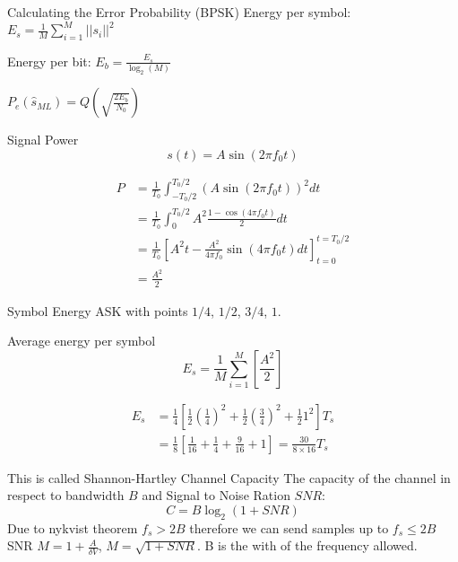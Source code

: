\begin{definitionblock}{Calculating the Error Probability (BPSK)}
    Energy per symbol: $E_s = \frac{1}{M}\sum_{i=1}^{M} ||s_i||^2$

    Energy per bit: $E_b = \frac{E_s}{\log_2(M)}$

    $P_e(\hat{s}_{ML}) = Q\left( \sqrt{\frac{2E_b}{N_0}} \right)$
\end{definitionblock}


\begin{exampleblock}{Signal Power}
    \begin{equation*}
        s(t) = A\sin(2\pi f_0 t)
    \end{equation*}

    \begin{align*}
        P &= \frac{1}{T_0} \int_{-T_0/2}^{T_0/2} (A\sin(2\pi f_0t))^2 dt \\
          &= \frac{1}{T_0} \int_{0}^{T_0/2} A^2\frac{1-\cos(4\pi f_0t)}{2} dt \\
          &= \frac{1}{T_0} \left[ A^2t - \frac{A^2}{4\pi f_0}\sin(4\pi f_0 t) dt \right]_{t=0}^{t={T_0/2}} \\
          &= \frac{A^2}{2}
    \end{align*}
\end{exampleblock}


\begin{exampleblock}{Symbol Energy}
    ASK with points $1/4$, $1/2$, $3/4$, $1$.

    Average energy per symbol
    \begin{equation*}
        E_s = \frac{1}{M}\sum_{i=1}^M \left[ \frac{A^2}{2} \right]
    \end{equation*}

    \begin{align*}
        E_s &= \frac{1}{4} \left[ 
             \frac{1}{2}\left(\frac{1}{4}\right)^2 
            +\frac{1}{2}\left(\frac{3}{4}\right)^2 
            +\frac{1}{2}1^2 \right] T_s \\
            &= \frac{1}{8} \left[ \frac{1}{16} + \frac{1}{4} + \frac{9}{16} + 1\right]
            = \frac{30}{8\times 16}T_s
    \end{align*}
\end{exampleblock}



\begin{definitionblock}{This is called Shannon-Hartley Channel Capacity}
    The capacity of the channel in respect to bandwidth $B$ and 
    Signal to Noise Ration $SNR$:
    \begin{equation}
        C = B\log_2(1+SNR)
    \end{equation}
    Due to nykvist theorem $f_s>2B$ therefore we can send samples up to $f_s\leq2B$
    SNR $M=1+\frac{A}{\delta{V}}$, $M=\sqrt{1+SNR}$. B is the with of the frequency allowed.
\end{definitionblock}

